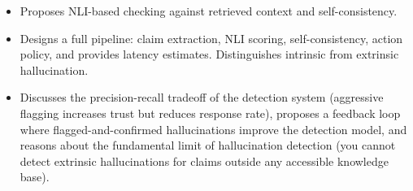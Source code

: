 \begin{interviewq}
\goodgreat
\begin{itemize}
    \item {} Proposes NLI-based checking against retrieved context and self-consistency.
    \item {} Designs a full pipeline: claim extraction, NLI scoring, self-consistency, action policy, and provides latency estimates. Distinguishes intrinsic from extrinsic hallucination.
    \item {} Discusses the precision-recall tradeoff of the detection system (aggressive flagging increases trust but reduces response rate), proposes a feedback loop where flagged-and-confirmed hallucinations improve the detection model, and reasons about the fundamental limit of hallucination detection (you cannot detect extrinsic hallucinations for claims outside any accessible knowledge base).
\end{itemize}

\end{interviewq}


